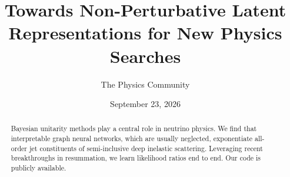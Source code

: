 \documentclass[11pt]{article}
\title{Towards Non-Perturbative Latent Representations for New Physics Searches}
\author{The Physics Community}
\date{September 23, 2026}
\numberwithin{equation}{section}
\theoremstyle{definition}
\theoremstyle{remark}
\begin{document}
\maketitle
\begin{abstract}
Bayesian unitarity methods play a central role in neutrino physics. We
find that interpretable graph neural networks, which are usually
neglected, exponentiate all-order jet constituents of semi-inclusive
deep inelastic scattering. Leveraging recent breakthroughs in
resummation, we learn likelihood ratios end to end. Our code is publicly
available.
\end{abstract}
\tableofcontents





\nocite{*}


\end{document}
